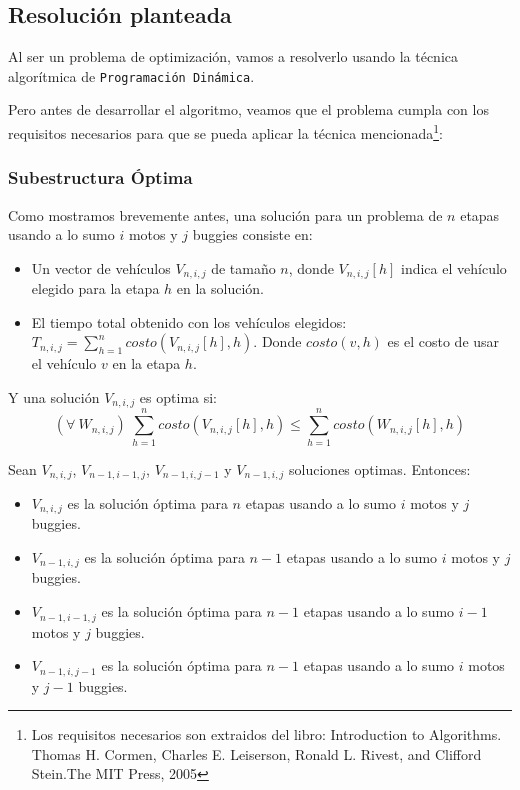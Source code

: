 \subsection{Resolución planteada}

Al ser un problema de optimización, vamos a resolverlo usando la técnica algorítmica de \texttt{Programación Dinámica}.

Pero antes de desarrollar el algoritmo, veamos que el problema cumpla con los requisitos necesarios para que se pueda aplicar la técnica mencionada\footnote{Los requisitos necesarios son extraidos del libro: Introduction to Algorithms. Thomas H. Cormen, Charles E. Leiserson, Ronald L. Rivest, and Clifford Stein.The MIT Press, 2005}:

    \subsubsection{Subestructura Óptima}
    Como mostramos brevemente antes, una solución para un problema de $n$ etapas usando a lo sumo $i$ motos y $j$ buggies consiste en:
    \begin{itemize}
        \item Un vector de vehículos $V_{n,i,j}$ de tamaño $n$, donde $V_{n,i,j}[h]$ indica el vehículo elegido para la etapa $h$ en la solución.
        \item El tiempo total obtenido con los vehículos elegidos: $T_{n,i,j} = \sum_{h=1}^{n}{costo(V_{n,i,j}[h], h)}$. Donde $costo(v, h)$ es el costo de usar el vehículo $v$ en la etapa $h$.
    \end{itemize}

    Y una solución $V_{n,i,j}$ es optima si:
    $$(\forall\ W_{n,i,j})\ \sum_{h=1}^{n}{costo(V_{n,i,j}[h], h)} \leq \sum_{h=1}^{n}{costo(W_{n,i,j}[h], h)}$$

    Sean $V_{n,i,j}$, $V_{n-1,i-1,j}$, $V_{n-1,i,j-1}$ y $V_{n-1,i,j}$ soluciones optimas. Entonces:
    \begin{itemize}
        \item $V_{n,i,j}$ es la solución óptima para $n$ etapas usando a lo sumo $i$ motos y $j$ buggies.
        \item $V_{n-1,i,j}$ es la solución óptima para $n-1$ etapas usando a lo sumo $i$ motos y $j$ buggies.
        \item $V_{n-1,i-1,j}$ es la solución óptima para $n-1$ etapas usando a lo sumo $i-1$ motos y $j$ buggies.
        \item $V_{n-1,i,j-1}$ es la solución óptima para $n-1$ etapas usando a lo sumo $i$ motos y $j-1$ buggies.
    \end{itemize}

